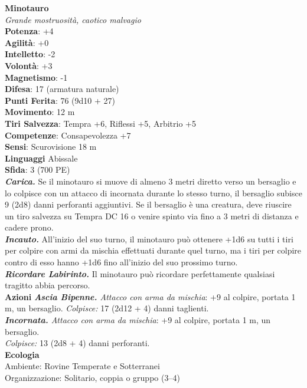 \begin{multicols}{2}
\medskip\textbf{Minotauro}\\
\emph{Grande mostruosità, caotico malvagio}\\
\textbf{Potenza}: +4\\
\textbf{Agilità}: +0\\
\textbf{Intelletto}: -2\\
\textbf{Volontà}: +3\\
\textbf{Magnetismo}: -1\\
\textbf{Difesa}: 17 (armatura naturale)\\
\textbf{Punti Ferita}: 76 (9d10 + 27)\\
\textbf{Movimento}: 12 m\\
\textbf{Tiri Salvezza}: Tempra +6, Riflessi +5, Arbitrio +5\\
\textbf{Competenze}: Consapevolezza +7\\
\textbf{Sensi}: Scurovisione 18 m\\
\textbf{Linguaggi} Abissale\\
\textbf{Sfida}: 3 (700 PE)\smallskip\\
\emph{\textbf{Carica.}} Se il minotauro si muove di almeno 3 metri diretto verso un bersaglio e lo colpisce con un attacco di incornata durante lo stesso turno, il bersaglio subisce 9 (2d8) danni perforanti aggiuntivi. Se il bersaglio è una creatura, deve riuscire un tiro salvezza su Tempra DC  16 o venire spinto via fino a 3 metri di distanza e cadere prono.\\
\emph{\textbf{Incauto.}} All'inizio del suo turno, il minotauro può ottenere +1d6 su tutti i tiri per colpire con armi da mischia effettuati durante quel turno, ma i tiri per colpire contro di esso hanno +1d6 fino all'inizio del suo prossimo turno.\\
\emph{\textbf{Ricordare Labirinto.}} Il minotauro può ricordare perfettamente qualsiasi tragitto abbia percorso.\\
\smallskip\textbf{Azioni}  
\emph{\textbf{Ascia Bipenne.} Attacco con arma da mischia}: +9 al colpire, portata 1 m, un bersaglio.
\emph{Colpisce:} 17 (2d12 + 4) danni taglienti.\\
\emph{\textbf{Incornata.} Attacco con arma da mischia}: +9 al colpire, portata 1 m, un bersaglio.\\
\emph{Colpisce:} 13 (2d8 + 4) danni perforanti.\\
\textbf{Ecologia}\\
Ambiente: Rovine Temperate e Sotterranei\\
Organizzazione: Solitario, coppia o gruppo (3–4)\\

\end{multicols}
